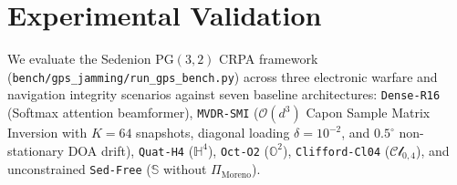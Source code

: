 \documentclass[11pt,a4paper]{article}
\theoremstyle{definition}
\theoremstyle{remark}
\newcommand{\Ha}{\mathbb{H}}
\newcommand{\Oc}{\mathbb{O}}
\newcommand{\Se}{\mathbb{S}}
\newcommand{\PG}{\mathrm{PG}}
\newcommand{\PiMoreno}{\Pi_{\mathrm{Moreno}}}
\begin{document}
\section{Experimental Validation}
\label{sec:experiments}

We evaluate the Sedenion $\PG(3,2)$ CRPA framework (\texttt{bench/gps\_jamming/run\_gps\_bench.py}) across three electronic warfare and navigation integrity scenarios against seven baseline architectures: \texttt{Dense-R16} (Softmax attention beamformer), \texttt{MVDR-SMI} ($\mathcal{O}(d^3)$ Capon Sample Matrix Inversion with $K=64$ snapshots, diagonal loading $\delta = 10^{-2}$, and $0.5^\circ$ non-stationary DOA drift), \texttt{Quat-H4} ($\Ha^4$), \texttt{Oct-O2} ($\Oc^2$), \texttt{Clifford-Cl04} ($\mathcal{Cl}_{0,4}$), and unconstrained \texttt{Sed-Free} ($\Se$ without $\PiMoreno$).
\end{document}
